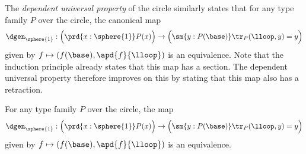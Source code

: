 The \emph{dependent universal property} of the circle similarly states that for any type family $P$ over the circle, the canonical map
\begin{equation*}
  \dgen_{\sphere{1}}:\Big(\prd{x:\sphere{1}}P(x)\Big)\to\Big(\sm{y:P(\base)}\tr_P(\lloop,y)=y\Big)
\end{equation*}
given by $f\mapsto(f(\base),\apd{f}{\lloop})$ is an equivalence. Note that the induction principle already states that this map has a section. The dependent universal property therefore improves on this by stating that this map also has a retraction.

\begin{thm}\label{thm:circle-dependent-universal-property}
  For any type family $P$ over the circle, the map
  \begin{equation*}
    \dgen_{\sphere{1}}:
    \Big(\prd{x:\sphere{1}}P(x)\Big)
    \to
    \Big(\sm{y:P(\base)}\tr_P(\lloop,y)=y\Big)
  \end{equation*}
  given by $f\mapsto(f(\base),\apd{f}{\lloop})$ is an equivalence.
\end{thm}

